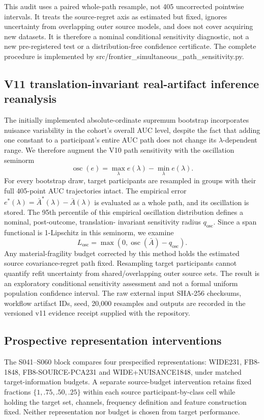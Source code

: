 This audit uses a paired whole-path resample, not 405 uncorrected
pointwise intervals. It treats the source-regret axis as estimated but
fixed, ignores uncertainty from overlapping outer source models, and
does not cover acquiring new datasets. It is therefore a nominal
conditional sensitivity diagnostic, not a new pre-registered test or a
distribution-free confidence certificate. The complete procedure is
implemented by src/frontier\_simultaneous\_path\_sensitivity.py.

\subsection{V11 translation-invariant real-artifact inference reanalysis}
The initially implemented absolute-ordinate supremum bootstrap incorporates
nuisance variability in the cohort's overall AUC level, despite the fact
that adding one constant to a participant's entire AUC path does not change
its \(\lambda\)-dependent range. We therefore augment the V10 path
sensitivity with the oscillation seminorm
\[
 \operatorname{osc}(e)=\max_\lambda e(\lambda)-\min_\lambda e(\lambda).
\]
For every bootstrap draw, target participants are resampled in groups with
their full 405-point AUC trajectories intact. The empirical error
\(e^*(\lambda)=\bar A^*(\lambda)-\bar A(\lambda)\) is evaluated as a whole
path, and its oscillation is stored. The 95th percentile of this empirical
oscillation distribution defines a nominal, post-outcome, translation-
invariant sensitivity radius \(q_{\mathrm{osc}}\). Since a span functional
is 1-Lipschitz in this seminorm, we examine
\[
 L_{\mathrm{osc}}=\max(0,\operatorname{osc}(\bar A)-q_{\mathrm{osc}}).
\]
Any material-fragility budget corrected by this method holds the estimated
source covariance-regret path fixed. Resampling target participants cannot
quantify refit uncertainty from shared/overlapping outer source sets.
The result is an exploratory conditional sensitivity assessment and not
a formal uniform population confidence interval. The raw external input SHA-256 checksums, workflow artifact IDs, seed,
20,000 resamples and outputs are recorded in the versioned v11 evidence
receipt supplied with the repository.

\subsection{Prospective representation interventions}
The S041--S060 block compares four prespecified representations:
WIDE231, FB8-1848, FB8-\allowbreak SOURCE-\allowbreak PCA231 and
WIDE+\allowbreak NUISANCE1848, under matched target-information budgets. A separate
source-budget intervention retains fixed fractions
\(\{1,.75,.50,.25\}\) within each source participant-by-class cell while
holding the target set, channels, frequency definition and feature
construction fixed. Neither representation nor budget is chosen from target
performance.

